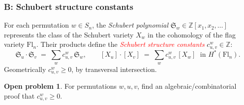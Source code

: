 \documentclass{beamer}
\theoremstyle{definition}
\newtheorem*{OpenProblem}{Open problem}
\newcommand\ZZ{\mathbb{Z}}
\newcommand\remph[1]{\emph{\textcolor{red}{#1}}}
\begin{document}
\begin{frame}
  \frametitle{B: Schubert structure constants}
  For each permutation \( w \in S_n \), the \emph{Schubert polynomial}
  \( \mathfrak{S}_w \in \ZZ[x_1,x_2,\ldots] \) represents the class of the
  Schubert variety \( X_w \) in the cohomology of the flag variety
  \( \mathrm{Fl}_n \). Their products define the \remph{Schubert structure
  constants} \( c^w_{u,v} \in \ZZ \):
  \[
    \mathfrak{S}_u \cdot \mathfrak{S}_v \;=\; \sum_w c^w_{u,v}\, \mathfrak{S}_w,
    \qquad
    [X_u] \cdot [X_v] \;=\; \sum_w c^w_{u,v}\, [X_w] \;\text{ in } H^*(\mathrm{Fl}_n).
  \]
  \pause
  Geometrically \( c^w_{u,v} \ge 0 \), by transversal intersection.
  \pause

  \begin{OpenProblem}
    For permutations \( w, u, v \), find an algebraic/combinatorial proof
    that \( c^w_{u,v} \ge 0 \).
  \end{OpenProblem}
\end{frame}

\end{document}
